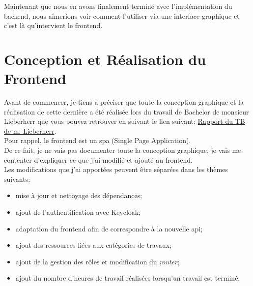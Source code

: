 \documentclass[
    iai, %
    il, %
]{heig-tb}
\begin{document}
Maintenant que nous en avons finalement terminé avec l'implémentation du \Gls{backend}, nous aimerions voir comment l'utiliser via une interface graphique et c'est là qu'intervient le \Gls{frontend}.

\chapter{Conception et Réalisation du Frontend}
Avant de commencer, je tiens à préciser que toute la conception graphique et la réalisation de cette dernière a été réalisée lors du travail de Bachelor de monsieur Lieberherr que vous pouvez retrouver en suivant le lien suivant: \href{https://tb.heig-vd.ch/7532}{Rapport du TB de m. Lieberherr}. \\
Pour rappel, le \Gls{frontend} est un \Gls{spa} (Single Page Application). \\
De ce fait, je ne vais pas documenter toute la conception graphique, je vais me contenter d'expliquer ce que j'ai modifié et ajouté au \Gls{frontend}. \\
Les modifications que j'ai apportées peuvent être séparées dans les thèmes suivants:
\begin{itemize}
    \item mise à jour et nettoyage des dépendances;
    \item ajout de l'authentification avec Keycloak;
    \item adaptation du \Gls{frontend} afin de correspondre à la nouvelle \Gls{api};
    \item ajout des ressources liées aux catégories de travaux;
    \item ajout de la gestion des rôles et modification du \emph{router};
    \item ajout du nombre d'heures de travail réalisées lorsqu'un travail est terminé.
\end{itemize}
\end{document}
